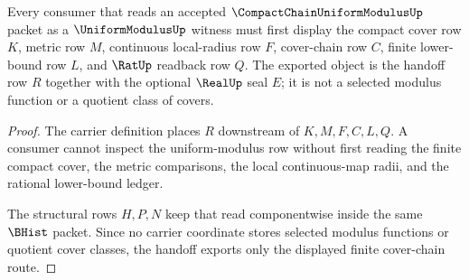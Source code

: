 \begin{theorem}
\label{thm:compact-chain-uniform-modulus-finite-cover-chain-handoff}
Every consumer that reads an accepted $\CompactChainUniformModulusUp$ packet as a $\UniformModulusUp$ witness must first display the compact cover row $K$, metric row $M$, continuous local-radius row $F$, cover-chain row $C$, finite lower-bound row $L$, and $\RatUp$ readback row $Q$. The exported object is the handoff row $R$ together with the optional $\RealUp$ seal $E$; it is not a selected modulus function or a quotient class of covers.
\end{theorem}
\begin{proof}
The carrier definition places $R$ downstream of $K,M,F,C,L,Q$. A consumer cannot inspect the uniform-modulus row without first reading the finite compact cover, the metric comparisons, the local continuous-map radii, and the rational lower-bound ledger.

The structural rows $H,P,N$ keep that read componentwise inside the same $\BHist$ packet. Since no carrier coordinate stores selected modulus functions or quotient cover classes, the handoff exports only the displayed finite cover-chain route.
\end{proof}




